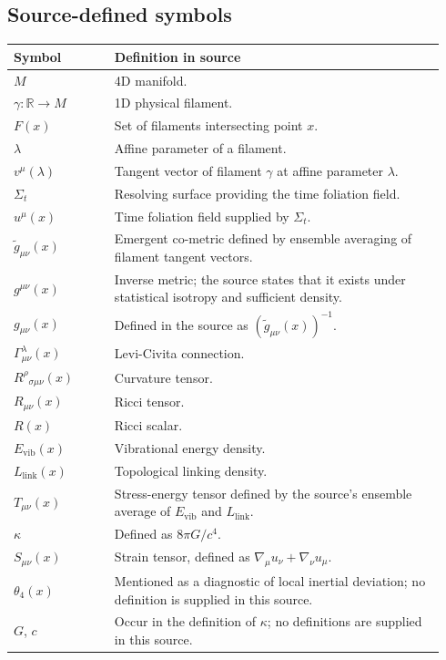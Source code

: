 \documentclass[11pt]{article}
\begin{document}
\subsection*{Source-defined symbols}
\begin{longtable}{L{0.22\linewidth}L{0.72\linewidth}}
\toprule
\textbf{Symbol} & \textbf{Definition in source}\\
\midrule
\endhead
$M$ & 4D manifold.\\
$\gamma:\mathbb{R}\to M$ & 1D physical filament.\\
$F(x)$ & Set of filaments intersecting point $x$.\\
$\lambda$ & Affine parameter of a filament.\\
$v^\mu(\lambda)$ & Tangent vector of filament $\gamma$ at affine parameter $\lambda$.\\
$\Sigma_t$ & Resolving surface providing the time foliation field.\\
$u^\mu(x)$ & Time foliation field supplied by $\Sigma_t$.\\
$\widetilde g_{\mu\nu}(x)$ & Emergent co-metric defined by ensemble averaging of filament tangent vectors.\\
$g^{\mu\nu}(x)$ & Inverse metric; the source states that it exists under statistical isotropy and sufficient density.\\
$g_{\mu\nu}(x)$ & Defined in the source as $(\widetilde g_{\mu\nu}(x))^{-1}$.\\
$\Gamma^\lambda_{\mu\nu}(x)$ & Levi-Civita connection.\\
$R^\rho{}_{\sigma\mu\nu}(x)$ & Curvature tensor.\\
$R_{\mu\nu}(x)$ & Ricci tensor.\\
$R(x)$ & Ricci scalar.\\
$E_{\mathrm{vib}}(x)$ & Vibrational energy density.\\
$L_{\mathrm{link}}(x)$ & Topological linking density.\\
$T_{\mu\nu}(x)$ & Stress-energy tensor defined by the source's ensemble average of $E_{\mathrm{vib}}$ and $L_{\mathrm{link}}$.\\
$\kappa$ & Defined as $8\pi G/c^4$.\\
$S_{\mu\nu}(x)$ & Strain tensor, defined as $\nabla_\mu u_\nu+\nabla_\nu u_\mu$.\\
$\theta_4(x)$ & Mentioned as a diagnostic of local inertial deviation; no definition is supplied in this source.\\
$G$, $c$ & Occur in the definition of $\kappa$; no definitions are supplied in this source.\\
\bottomrule
\end{longtable}
\end{document}
